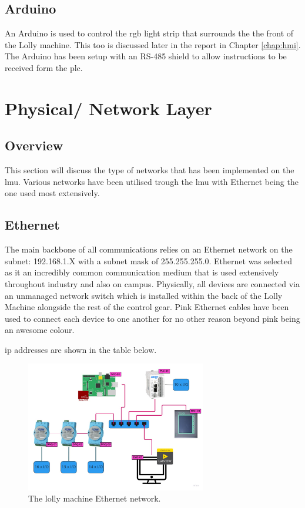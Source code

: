     
    
    \subsection{Arduino}
    An Arduino is used to control the \acrshort{rgb} light strip that surrounds the the front of the Lolly machine. This too is discussed later in the report in Chapter \ref{chap:hmi}. The Arduino has been setup with an RS-485 shield to allow instructions to be received form the \acrshort{plc}.
    
    \section{Physical/ Network Layer}
    
    \subsection{Overview}
    This section will discuss the type of networks that has been implemented on the \acrshort{lmu}. Various networks have been utilised trough the \acrshort{lmu} with Ethernet being the one used most extensively.
    
    \subsection{Ethernet} 
    The main backbone of all communications relies on an Ethernet network on the subnet: 192.168.1.X with a subnet mask of 255.255.255.0. Ethernet was selected as it an incredibly common communication medium that is used extensively throughout industry and also on campus. Physically, all devices are connected via an unmanaged network switch which is installed within the back of the Lolly Machine alongside the rest of the control gear. Pink Ethernet cables have been used to connect each device to one another for no other reason beyond pink being an awesome colour.
    
    \acrshort{ip} addresses are shown in the table below.	

        \begin{figure}[H]
            \centering
            \includegraphics[width = 0.7\textwidth]{2_images/ethernetLollyMachine.png}
            \caption{The lolly machine Ethernet network.}
            \label{fig:ethernetLollyMachine}
        \end{figure}
    
